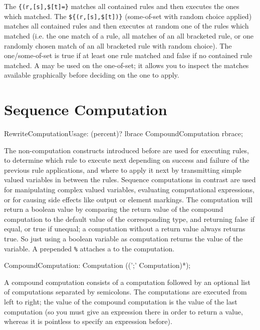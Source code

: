 The  \verb/{(r,[s],$[t]=}/ matches all contained rules and then executes the ones which matched.
The  \verb/${(r,[s],$[t])}/ (some-of-set with random choice applied) matches all contained rules and then executes at random one of the rules which matched
(i.e. the one match of a rule, all matches of an all bracketed rule, or one randomly chosen match of an all bracketed rule with random choice).
The one/some-of-set is true if at least one rule matched and false if no contained rule matched.
A  may be used on the one-of-set; it allows you to inspect the matches available graphically before deciding on the one to apply. 


\section{Sequence Computation} \label{sec:seqcomp}

\begin{rail} 
  RewriteComputationUsage: (percent)? lbrace CompoundComputation rbrace; 
\end{rail}

The non-computation constructs introduced before are used for executing rules, to determine which rule to execute next depending on success and failure of the previous rule applications, and where to apply it next by transmitting simple valued variables in between the rules.
Sequence computations in contrast are used for manipulating complex valued variables, evaluating computational expressions, or for causing side effects like output or element markings.
The computation will return a boolean value by comparing the return value of the compound computation to the default value of the corresponding type, and returning false if equal, or true if unequal; a computation without a return value always returns true.
So just using a boolean variable as computation returns the value of the variable.
A prepended \texttt{\%} attaches a  to the computation.

\begin{rail} 
  CompoundComputation: Computation ((';' Computation)*); 
\end{rail}

A compound computation consists of a computation followed by an optional list of computations separated by semicolons.
The computations are executed from left to right;
the value of the compound computation is the value of the last computation (so you must give an expression there in order to return a value, whereas it is pointless to specify an expression before).

